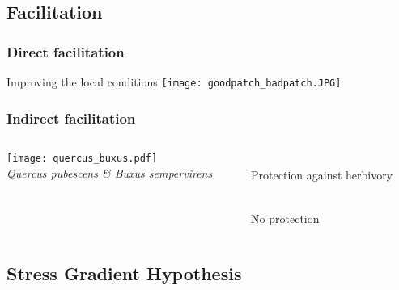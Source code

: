 \documentclass{beamer}[12pt]
\begin{document}
\subsection{Facilitation}

\begin{frame}
\frametitle{Direct facilitation}

\begin{center}
Improving the local conditions
\vfill
\texttt{[image: goodpatch\_badpatch.JPG]}
\end{center}
\end{frame}

\begin{frame}
\frametitle{Indirect facilitation}

\begin{columns}
\begin{column}{0.5\textwidth}
\texttt{[image: quercus\_buxus.pdf]}\\
{\small \textit{Quercus pubescens \& Buxus sempervirens}}
\end{column}
\begin{column}{0.6\textwidth}
\begin{minipage}[t][0.3\textheight][t]{\textwidth}
\\
Protection against herbivory
\end{minipage}
\begin{minipage}[b][0.3\textheight][b]{\textwidth}
\\
No protection
\end{minipage}
\end{column}

\end{columns}

\end{frame}


\subsection{Stress Gradient Hypothesis}
\end{document}
